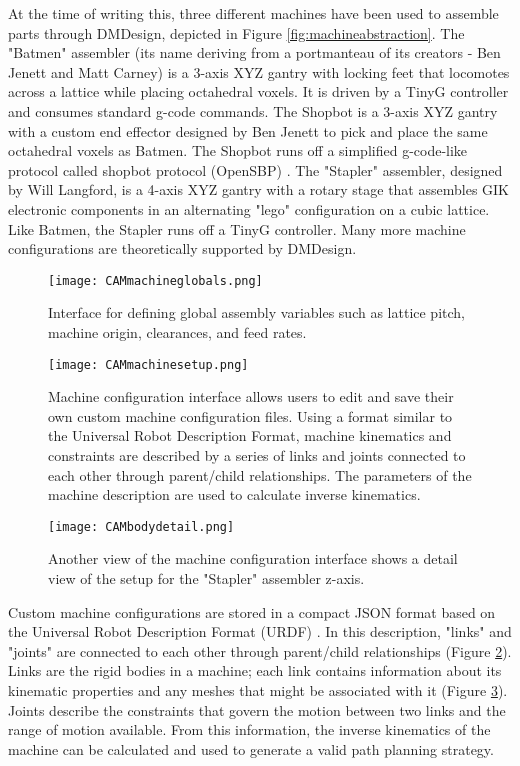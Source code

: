 {At the time of writing this, three different machines have been used to assemble parts through DMDesign, depicted in Figure \ref{fig:machineabstraction}.  The "Batmen" assembler (its name deriving from a portmanteau of its creators - Ben Jenett and Matt Carney) is a 3-axis XYZ gantry with locking feet that locomotes across a lattice while placing octahedral voxels.  It is driven by a TinyG controller \cite{Synthetos2016} and consumes standard g-code commands.  The Shopbot is a 3-axis XYZ gantry with a custom end effector designed by Ben Jenett to pick and place the same octahedral voxels as Batmen.  The Shopbot runs off a simplified g-code-like protocol called shopbot protocol (OpenSBP) \cite{Shopbot2016}.  The "Stapler" assembler, designed by Will Langford, is a 4-axis XYZ gantry with a rotary stage that assembles GIK electronic components in an alternating "lego" configuration on a cubic lattice.  Like Batmen, the Stapler runs off a TinyG controller.  Many more machine configurations are theoretically supported by DMDesign.\\

\begin{figure}
  \texttt{[image: CAMmachineglobals.png]}
  \caption{Interface for defining global assembly variables such as lattice pitch, machine origin, clearances, and feed rates.}
  \label{fig:CAMmachineglobals}
\end{figure}

\begin{figure}
  \texttt{[image: CAMmachinesetup.png]}
  \caption{Machine configuration interface allows users to edit and save their own custom machine configuration files.  Using a format similar to the Universal Robot Description Format, machine kinematics and constraints are described by a series of links and joints connected to each other through parent/child relationships.  The parameters of the machine description are used to calculate inverse kinematics.}
  \label{fig:CAMmachinesetup}
\end{figure}

\begin{figure}
  \texttt{[image: CAMbodydetail.png]}
  \caption{Another view of the machine configuration interface shows a detail view of the setup for the "Stapler" assembler z-axis.}
  \label{fig:CAMbodydetail}
\end{figure}

Custom machine configurations are stored in a compact JSON format based on the Universal Robot Description Format (URDF) \cite{ROS2016}.  In this description, "links" and "joints" are connected to each other through parent/child relationships (Figure \ref{fig:CAMmachinesetup}).  Links are the rigid bodies in a machine; each link contains information about its kinematic properties and any meshes that might be associated with it (Figure \ref{fig:CAMbodydetail}).  Joints describe the constraints that govern the motion between two links and the range of motion available.  From this information, the inverse kinematics of the machine can be calculated and used to generate a valid path planning strategy.\\

}
